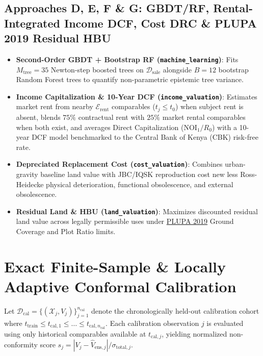 \documentclass[11pt,a4paper]{article}
\begin{document}
\subsection{Approaches D, E, F \& G: GBDT/RF, Rental-Integrated Income DCF, Cost DRC \& PLUPA 2019 Residual HBU}
\begin{itemize}
    \item \textbf{Second-Order GBDT + Bootstrap RF (\texttt{machine\_learning})}: Fits $M_{\text{tree}} = 35$ Newton-step boosted trees on $\mathcal{D}_{\text{sale}}$ alongside $B = 12$ bootstrap Random Forest trees to quantify non-parametric epistemic tree variance.
    \item \textbf{Income Capitalization \& 10-Year DCF (\texttt{income\_valuation})}: Estimates market rent from nearby $\mathcal{E}_{\text{rent}}$ comparables ($t_j \le t_0$) when subject rent is absent, blends $75\%$ contractual rent with $25\%$ market rental comparables when both exist, and averages Direct Capitalization ($\text{NOI}_1 / R_0$) with a 10-year DCF model benchmarked to the Central Bank of Kenya (CBK) risk-free rate.
    \item \textbf{Depreciated Replacement Cost (\texttt{cost\_valuation})}: Combines urban-gravity baseline land value with JBC/IQSK reproduction cost new less Ross-Heidecke physical deterioration, functional obsolescence, and external obsolescence.
    \item \textbf{Residual Land \& HBU (\texttt{land\_valuation})}: Maximizes discounted residual land value across legally permissible uses under \href{https://kara.or.ke/wp-content/uploads/2024/11/PhysicalandLandUsePlanningAct13of2019.pdf}{PLUPA 2019} Ground Coverage and Plot Ratio limits.
\end{itemize}

\section{Exact Finite-Sample \& Locally Adaptive Conformal Calibration}

Let $\mathcal{D}_{\text{cal}} = \{(\mathcal{X}_j, V_j)\}_{j=1}^{n_{\text{cal}}}$ denote the chronologically held-out calibration cohort where $t_{\text{train}} \le t_{\text{cal},1} \le \dots \le t_{\text{cal},n_{\text{cal}}}$. Each calibration observation $j$ is evaluated using only historical comparables available at $t_{\text{cal},j}$, yielding normalized non-conformity score $s_j = |V_j - \hat{V}_{\text{ens},j}| / \sigma_{\text{total},j}$.
\end{document}

